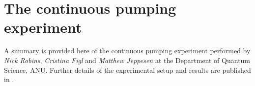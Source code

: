 % 
% 


\section{The continuous pumping experiment}
\label{OpticalPumping:ContinuousExperiment}

A summary is provided here of the continuous pumping experiment performed by \emph{Nick Robins}, \emph{Cristina Figl} and \emph{Matthew Jeppesen} at the Department of Quantum Science, ANU.  Further details of the experimental setup and results are published in \citet{Robins:2008}.

